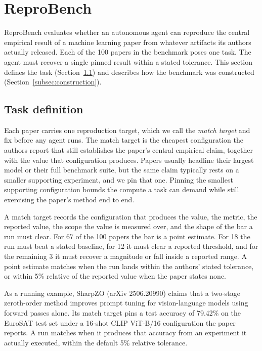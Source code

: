 \section{ReproBench}
\label{sec:reprobench}

ReproBench evaluates whether an autonomous agent can reproduce the central
empirical result of a machine learning paper from whatever artifacts its
authors actually released. Each of the 100 papers in the benchmark poses one
task. The agent must recover a single pinned result within a stated tolerance.
This section defines the task (Section~\ref{subsec:task}) and describes how
the benchmark was constructed (Section~\ref{subsec:construction}).

\subsection{Task definition}
\label{subsec:task}

Each paper carries one reproduction target, which we call the \emph{match
target} and fix before any agent runs. The match target is the cheapest
configuration the authors report that still establishes the paper's central
empirical claim, together with the value that configuration produces. Papers
usually headline their largest model or their full benchmark suite, but the
same claim typically rests on a smaller supporting experiment, and we pin that
one. Pinning the smallest supporting configuration bounds the compute a task
can demand while still exercising the paper's method end to end.

A match target records the configuration that produces the value, the metric,
the reported value, the scope the value is measured over, and the shape of the
bar a run must clear. For 67 of the 100 papers the bar is a point estimate.
For 18 the run must beat a stated baseline, for 12 it must clear a reported
threshold, and for the remaining 3 it must recover a magnitude or fall inside
a reported range. A point estimate matches when the run lands within the
authors' stated tolerance, or within 5\% relative of the reported value when
the paper states none.

As a running example, SharpZO (arXiv 2506.20990) claims that a two-stage
zeroth-order method improves prompt tuning for vision-language models using
forward passes alone. Its match target pins a test accuracy of 79.42\% on the
EuroSAT test set under a 16-shot CLIP ViT-B/16 configuration the paper
reports. A run matches when it produces that accuracy from an experiment it
actually executed, within the default 5\% relative tolerance.


